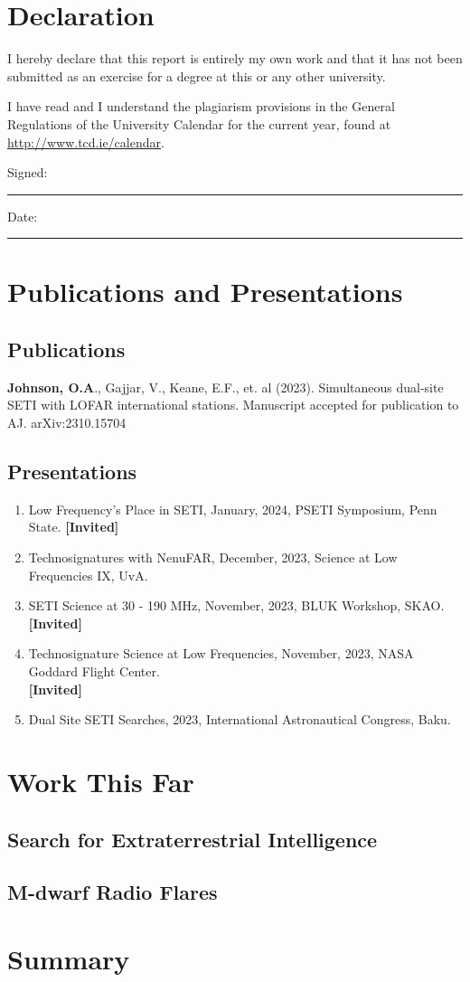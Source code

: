 \documentclass[a4paper,12pt]{article}
\begin{document}
\vfill
\section*{Declaration}
I hereby declare that this report is entirely my own work and that it has not been submitted as an exercise for a degree at this or any other university.

I have read and I understand the plagiarism provisions in the General Regulations of the University Calendar for the current year, found at \url{http://www.tcd.ie/calendar}.

\vspace{1cm}

Signed:~\rule{5cm}{0.3pt}\hfill Date:~\rule{5cm}{0.3pt}

\vfill
\hspace{0pt}
\newpage

\section*{Publications and Presentations}
\subsection*{Publications}

\textbf{Johnson, O.A}., Gajjar, V., Keane, E.F., et. al (2023). Simultaneous dual-site SETI with LOFAR international stations. Manuscript accepted for publication to AJ. arXiv:2310.15704

\subsection*{Presentations}
\begin{enumerate}
\item Low Frequency's Place in SETI, January, 2024, PSETI Symposium, Penn State. \hfill \textbf{[Invited]}
\item Technosignatures with NenuFAR, December, 2023, Science at Low Frequencies IX, UvA. 
\item SETI Science at 30 - 190 MHz, November, 2023, BLUK Workshop, SKAO.\\ \textbf{[Invited]}
\item Technosignature Science at Low Frequencies, November, 2023, NASA Goddard Flight Center. \hfill \\ \textbf{[Invited]}
\item Dual Site SETI Searches, 2023, International Astronautical Congress, Baku. 
\end{enumerate}

\newpage


\section{Work This Far}
\subsection{Search for Extraterrestrial Intelligence}
\subsection{M-dwarf Radio Flares}

\section{Summary}

\end{document}
